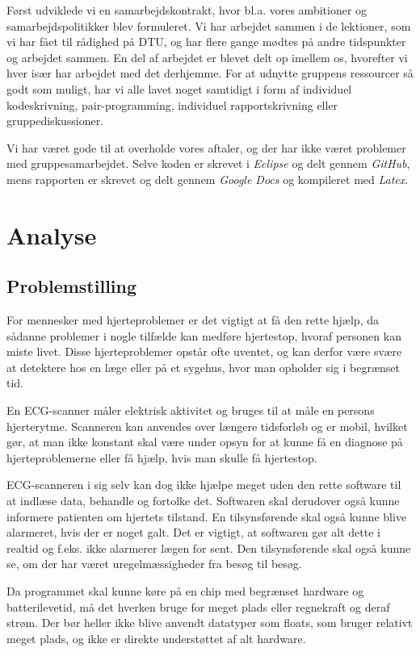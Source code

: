 \documentclass{article}
\begin{document}
Først udviklede vi en samarbejdskontrakt, hvor bl.a. vores ambitioner og samarbejdspolitikker blev formuleret. Vi har arbejdet sammen i de lektioner, som vi har fået til rådighed på DTU, og har flere gange mødtes på andre tidspunkter og arbejdet sammen. En del af arbejdet er blevet delt op imellem os, hvorefter vi hver især har arbejdet med det derhjemme. For at udnytte gruppens ressourcer så godt som muligt, har vi alle lavet noget samtidigt i form af individuel kodeskrivning, pair-programming, individuel rapportskrivning eller gruppediskussioner.

Vi har været gode til at overholde vores aftaler, og der har ikke været problemer med gruppesamarbejdet. Selve koden er skrevet i \textit{Eclipse} og delt gennem \textit{GitHub}, mens rapporten er skrevet og delt gennem \textit{Google Docs} og kompileret med \textit{Latex}.

\section{Analyse}
\subsection{Problemstilling}
For mennesker med hjerteproblemer er det vigtigt at få den rette hjælp, da sådanne problemer i nogle tilfælde kan medføre hjertestop, hvoraf personen kan miste livet. Disse hjerteproblemer opstår ofte uventet, og kan derfor være svære at detektere hos en læge eller på et sygehus, hvor man opholder sig i begrænset tid.

En ECG-scanner måler elektrisk aktivitet og bruges til at måle en persons hjerterytme. Scanneren kan anvendes over længere tidsforløb og er mobil, hvilket gør, at man ikke konstant skal være under opsyn for at kunne få en diagnose på hjerteproblemerne eller få hjælp, hvis man skulle få hjertestop.

ECG-scanneren i sig selv kan dog ikke hjælpe meget uden den rette software til at indlæse data, behandle og fortolke det. Softwaren skal derudover også kunne informere patienten om hjertets tilstand. En tilsynsførende skal også kunne blive alarmeret, hvis der er noget galt. Det er vigtigt, at softwaren gør alt dette i realtid og f.eks. ikke alarmerer lægen for sent. Den tilsynsførende skal også kunne se, om der har været uregelmæssigheder fra besøg til besøg.

Da programmet skal kunne køre på en chip med begrænset hardware og batterilevetid, må det hverken bruge for meget plads eller regnekraft og deraf strøm. Der bør heller ikke blive anvendt datatyper som floats, som bruger relativt meget plads, og ikke er direkte understøttet af alt hardware.
\end{document}
